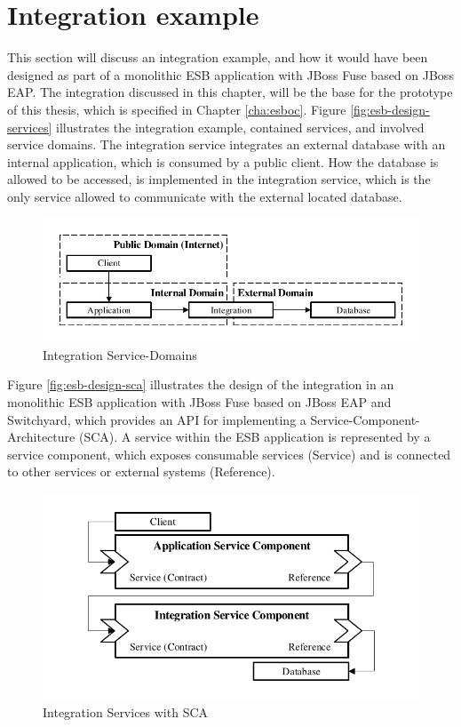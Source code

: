 \section{Integration example}
\label{sec:esb-integration-example}
This section will discuss an integration example, and how it would have been designed as part of a monolithic ESB application with JBoss Fuse based on JBoss EAP. The integration discussed in this chapter, will be the base for the prototype of this thesis, which is specified in Chapter \vref{cha:esboc}. Figure \vref{fig:esb-design-services} illustrates the integration example, contained services, and involved service domains. The integration service integrates an external database with an internal application, which is consumed by a public client. How the database is allowed to be accessed, is implemented in the integration service, which is the only service allowed to communicate with the external located database.

\begin{figure}[htbp]
	\centering
	\includegraphics[scale=1]{images/esb-integration-example.pdf}
	\caption{Integration Service-Domains}
	\label{fig:esb-design-services}
\end{figure}

Figure \vref{fig:esb-design-sca} illustrates the design of the integration in an monolithic ESB application with JBoss Fuse based on JBoss EAP and Switchyard, which provides an API for implementing a Service-Component-Architecture (SCA). A service within the ESB application is represented by a service component, which exposes consumable services (Service) and is connected to other services or external systems (Reference)\cite{Switchyard}. 

\begin{figure}[htbp]
	\centering
	\includegraphics[scale=1]{images/esb-sca-example.pdf}
	\caption{Integration Services with SCA}
	\label{fig:esb-design-sca}
\end{figure}
  
